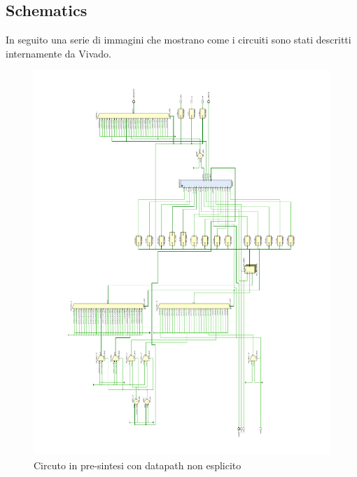 \documentclass[12pt]{article} %
\begin{document}
		\subsection{Schematics}
			In seguito una serie di immagini che mostrano come i circuiti sono stati descritti internamente
			da Vivado.
			\begin{figure}[H]
				\centering
				\includegraphics[width=\textwidth]{RTL_Closed_Schematic.pdf}
				\caption{Circuto in pre-sintesi con datapath non esplicito}
				\label{fig:Schematic_RTL_Closed}
			\end{figure}
\end{document}
